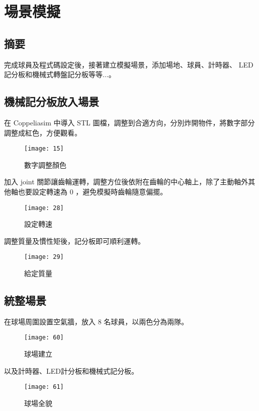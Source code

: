\chapter{場景模擬}
\renewcommand{\baselinestretch}{10.0} %
\setcounter{page}{17}  %
\fontsize{14pt}{2.5pt}\sectionef
\section{摘要}
  完成球員及程式碼設定後，接著建立模擬場景，添加場地、球員、計時器、 LED 記分板和機械式轉盤記分板等等...。\\
\section{機械記分板放入場景}
  在 Coppeliasim 中導入 STL 圖檔，調整到合適方向，分別炸開物件，將數字部分調整成紅色，方便觀看。\\
\begin{figure}[hbt!]
\begin{center}
\texttt{[image: 15]}
\caption{\Large 數字調整顏色}\label{fig.15}
\end{center}
\end{figure}

  加入 joint 關節讓齒輪運轉，調整方位後依附在齒輪的中心軸上，除了主動軸外其他軸也要設定轉速為 0 ，避免模擬時齒輪隨意偏擺。\\
\begin{figure}[hbt!]
\begin{center}
\texttt{[image: 28]}
\caption{\Large 設定轉速}\label{fig.28}
\end{center}
\end{figure}
\newpage
  調整質量及慣性矩後，記分板即可順利運轉。\\
\begin{figure}[hbt!]
\begin{center}
\texttt{[image: 29]}
\caption{\Large 給定質量}\label{fig.29}
\end{center}
\end{figure}

\newpage
\section{統整場景}
  在球場周圍設置空氣牆，放入 8 名球員，以兩色分為兩隊。\\
\begin{figure}[hbt!]
\begin{center}
\texttt{[image: 60]}
\caption{\Large 球場建立}\label{fig.60}
\end{center}
\end{figure}

  以及計時器、LED計分板和機械式記分板。\\
\begin{figure}[hbt!]
\begin{center}
\texttt{[image: 61]}
\caption{\Large 球場全貌}\label{fig.61}
\end{center}
\end{figure}
\renewcommand{\baselinestretch}{1} %